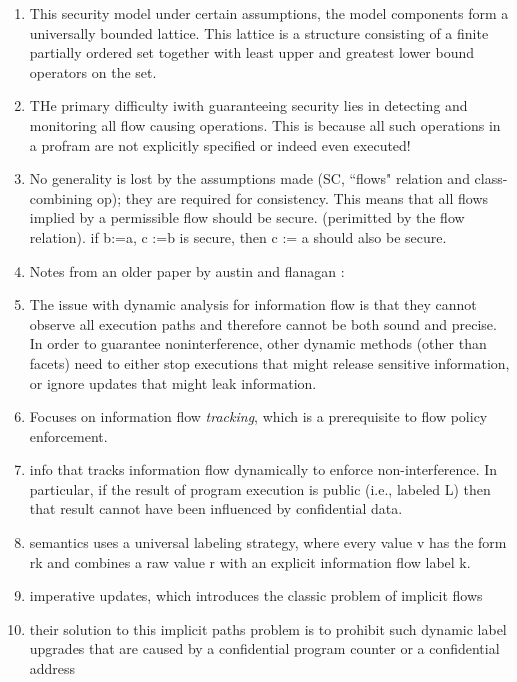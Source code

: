 \documentclass[11pt,letterpaper]{article}
\begin{document}
\begin{enumerate}
\item This security model under certain assumptions, the model components form a universally bounded lattice. This lattice is a structure consisting of a finite partially ordered set together with least upper and greatest lower bound operators on the set.

\item THe primary difficulty iwith guaranteeing security lies in detecting and monitoring all flow causing operations. This is because all such operations in a profram are not explicitly specified or indeed even executed!

\item No generality is lost by the assumptions made (SC, ``flows" relation and class-combining op); they are required for consistency. This means that all flows implied by a permissible flow should be secure. (perimitted by the flow relation). if b:=a, c :=b is secure, then c := a should also be secure.


\item Notes from an older paper by austin and flanagan \cite{austin2009efficient}:
\item The issue with dynamic analysis for information flow is that they cannot observe all execution paths and therefore cannot be both sound and precise.  In order to guarantee noninterference, other dynamic methods (other than facets) need to either stop executions that might release sensitive information, or ignore updates that might leak information.

\item Focuses on information flow \textit{tracking}, which is a prerequisite to flow policy enforcement.

\item  info that tracks information flow dynamically to enforce non-interference. In particular, if the result of program execution is public (i.e., labeled L) then that result cannot have been influenced by confidential data.

\item semantics uses a universal labeling strategy, where every value v has the form rk and combines a raw value r with an explicit information flow label k.

\item imperative updates, which introduces the classic problem of implicit flows \cite{denning1976lattice}

\item their solution  to  this implicit paths problem is to prohibit such dynamic label upgrades that are caused by a confidential program counter or a confidential address


\end{enumerate}
\end{document}
